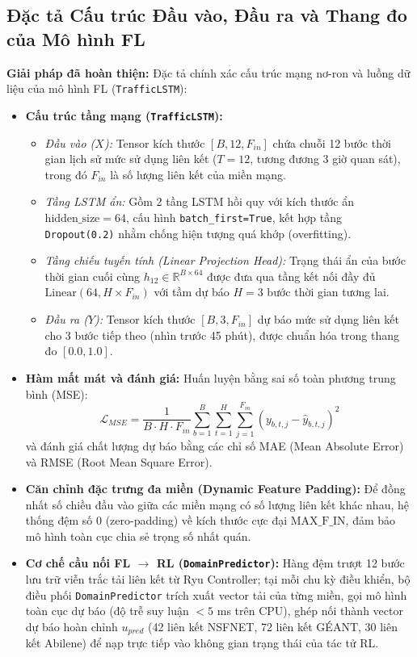 \documentclass[11pt,a4paper]{article}
\begin{document}
\subsection{Đặc tả Cấu trúc Đầu vào, Đầu ra và Thang đo của Mô hình FL}
\textbf{Giải pháp đã hoàn thiện:} Đặc tả chính xác cấu trúc mạng nơ-ron và luồng dữ liệu của mô hình FL (\texttt{TrafficLSTM}):
\begin{itemize}
    \item \textbf{Cấu trúc tầng mạng (\texttt{TrafficLSTM}):}
    \begin{itemize}
        \item \textit{Đầu vào ($X$):} Tensor kích thước $[B, 12, F_{in}]$ chứa chuỗi 12 bước thời gian lịch sử mức sử dụng liên kết ($T=12$, tương đương 3 giờ quan sát), trong đó $F_{in}$ là số lượng liên kết của miền mạng.
        \item \textit{Tầng LSTM ẩn:} Gồm 2 tầng LSTM hồi quy với kích thước ẩn $\text{hidden\_size} = 64$, cấu hình \texttt{batch\_first=True}, kết hợp tầng \texttt{Dropout(0.2)} nhằm chống hiện tượng quá khớp (overfitting).
        \item \textit{Tầng chiếu tuyến tính (Linear Projection Head):} Trạng thái ẩn của bước thời gian cuối cùng $h_{12} \in \mathbb{R}^{B \times 64}$ được đưa qua tầng kết nối đầy đủ $\text{Linear}(64, H \times F_{in})$ với tầm dự báo $H = 3$ bước thời gian tương lai.
        \item \textit{Đầu ra ($\hat{Y}$):} Tensor kích thước $[B, 3, F_{in}]$ dự báo mức sử dụng liên kết cho 3 bước tiếp theo (nhìn trước 45 phút), được chuẩn hóa trong thang đo $[0.0, 1.0]$.
    \end{itemize}
    \item \textbf{Hàm mất mát và đánh giá:} Huấn luyện bằng sai số toàn phương trung bình (MSE):
    \begin{equation}
        \mathcal{L}_{MSE} = \frac{1}{B \cdot H \cdot F_{in}} \sum_{b=1}^B \sum_{t=1}^H \sum_{j=1}^{F_{in}} (y_{b,t,j} - \hat{y}_{b,t,j})^2
    \end{equation}
    và đánh giá chất lượng dự báo bằng các chỉ số MAE (Mean Absolute Error) và RMSE (Root Mean Square Error).
    \item \textbf{Căn chỉnh đặc trưng đa miền (Dynamic Feature Padding):} Để đồng nhất số chiều đầu vào giữa các miền mạng có số lượng liên kết khác nhau, hệ thống đệm số 0 (zero-padding) về kích thước cực đại $\text{MAX\_F\_IN}$, đảm bảo mô hình toàn cục chia sẻ trọng số nhất quán.
    \item \textbf{Cơ chế cầu nối FL $\to$ RL (\texttt{DomainPredictor}):} Hàng đệm trượt 12 bước lưu trữ viễn trắc tải liên kết từ Ryu Controller; tại mỗi chu kỳ điều khiển, bộ điều phối \texttt{DomainPredictor} trích xuất vector tải của từng miền, gọi mô hình toàn cục dự báo (độ trễ suy luận $< 5$ ms trên CPU), ghép nối thành vector dự báo hoàn chỉnh $u_{pred}$ (42 liên kết NSFNET, 72 liên kết GÉANT, 30 liên kết Abilene) để nạp trực tiếp vào không gian trạng thái của tác tử RL.
\end{itemize}
\end{document}
